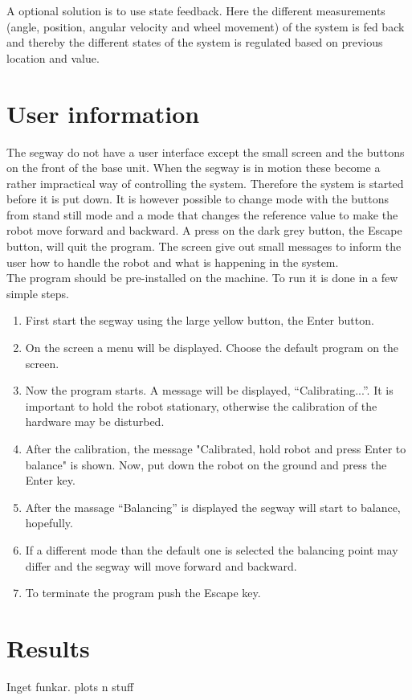 \documentclass[a4paper]{article}
\begin{document}
A optional solution is to use state feedback. Here the different measurements (angle, position, angular velocity and wheel movement) of the system is fed back and thereby the different states of the system is regulated based on previous location and value.

\section{User information}

The segway do not have a user interface except the small screen and the buttons on the front of the base unit. When the segway is in motion these become a rather impractical way of controlling the system. Therefore the system is started before it is put down. It is however possible to change mode with the buttons from stand still mode and a mode that changes the reference value to make the robot move forward and backward. A press on the dark grey button, the Escape button, will quit the program. The screen give out small messages to inform the user how to handle the robot and what is happening in the system.\\

The program should be pre-installed on the machine. To run it is done in a few simple steps. 

\begin{enumerate}
\item First start the segway using the large yellow button, the Enter button.
\item On the screen a menu will be displayed. Choose the default program on the screen.
\item Now the program starts. A message will be displayed, “Calibrating...”. It is important to hold the robot stationary, otherwise the calibration of the hardware may be disturbed.
\item After the calibration, the message "Calibrated, hold robot and press Enter to balance" is shown. Now, put down the robot on the ground and press the Enter key.
\item After the massage “Balancing” is displayed the segway will start to balance, hopefully. 
\item If a different mode than the default one is selected the balancing point may differ and the segway will move forward and backward.
\item To terminate the program push the Escape key.
\end{enumerate}

\section{Results}
Inget funkar. plots n stuff\\
\end{document}
